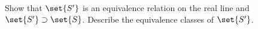 \documentclass[main.tex]{subfiles}
\begin{document}
\subproblem{}\label{s03p05a}

Show that \(\set{S'}\) is an equivalence relation on the real line and
\(\set{S'}\isasupersetof\set{S}\). Describe the equivalence classes of
\(\set{S'}\).

\todo{}
\end{document}
